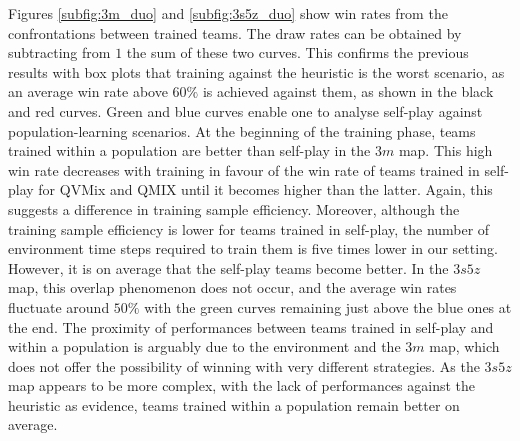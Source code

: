 Figures \ref{subfig:3m_duo} and \ref{subfig:3s5z_duo} show win rates from the confrontations between trained teams.
The draw rates can be obtained by subtracting from $1$ the sum of these two curves.
This confirms the previous results with box plots that training against the heuristic is the worst scenario, as an average win rate above $60\%$ is achieved against them, as shown in the black and red curves.
Green and blue curves enable one to analyse self-play against population-learning scenarios.
At the beginning of the training phase, teams trained within a population are better than self-play in the $3m$ map.
This high win rate decreases with training in favour of the win rate of teams trained in self-play for QVMix and QMIX until it becomes higher than the latter.
Again, this suggests a difference in training sample efficiency.
Moreover, although the training sample efficiency is lower for teams trained in self-play, the number of environment time steps required to train them is five times lower in our setting.
However, it is on average that the self-play teams become better.
In the $3s5z$ map, this overlap phenomenon does not occur, and the average win rates fluctuate around $50\%$ with the green curves remaining just above the blue ones at the end.
The proximity of performances between teams trained in self-play and within a population is arguably due to the environment and the $3m$ map, which does not offer the possibility of winning with very different strategies.
As the $3s5z$ map appears to be more complex, with the lack of performances against the heuristic as evidence, teams trained within a population remain better on average.

